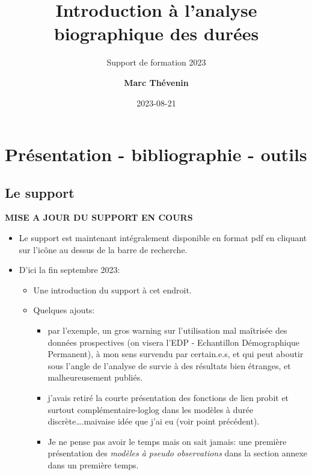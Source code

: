 \documentclass[
  12pt,
  letterpaper,
  DIV=11,
  numbers=noendperiod,
  onepage,
  openany]{scrreprt}
\title{Introduction à l'analyse biographique des durées}
\subtitle{Support de formation 2023}
\author{\textbf{Marc Thévenin}}
\date{2023-08-21}
\providecommand{\tightlist}{%
  \setlength{\itemsep}{0pt}\setlength{\parskip}{0pt}}\usepackage{longtable,booktabs,array}
\renewcommand*\contentsname{Table des matières}
\newcommand\contentsname{Table des matières}
\begin{document}
\maketitle
\renewcommand*\contentsname{Table des matières}
{
\hypersetup{linkcolor=}
\setcounter{tocdepth}{3}
\tableofcontents
}
\listoffigures
\listoftables
\hypertarget{pruxe9sentation---bibliographie---outils}{%
\chapter{\texorpdfstring{\textbf{Présentation - bibliographie -
outils}}{Présentation - bibliographie - outils}}\label{pruxe9sentation---bibliographie---outils}}

\hypertarget{le-support}{%
\section*{Le support}\label{le-support}}


\textbf{MISE A JOUR DU SUPPORT EN COURS}

\begin{itemize}
\item
  Le support est maintenant intégralement disponible en format pdf en
  cliquant sur l'icône au dessus de la barre de recherche.
\item
  D'ici la fin septembre 2023:

  \begin{itemize}
  \tightlist
  \item
    Une introduction du support à cet endroit.
  \item
    Quelques ajouts:

    \begin{itemize}
    \tightlist
    \item
      par l'exemple, un gros warning sur l'utilisation mal maîtrisée des
      données prospectives (on visera l'EDP - Echantillon Démographique
      Permanent), à mon sens survendu par certain.e.s, et qui peut
      aboutir sous l'angle de l'analyse de survie à des résultats bien
      étranges, et malheureusement publiés.
    \item
      j'avais retiré la courte présentation des fonctions de lien probit
      et surtout complémentaire-loglog dans les modèles à durée
      discrète\ldots.maivaise idée que j'ai eu (voir point précédent).
    \item
      Je ne pense pas avoir le temps mais on sait jamais: une première
      présentation des \emph{modèles à pseudo observations} dans la
      section annexe dans un première temps.
    \end{itemize}
  \end{itemize}
\end{itemize}
\end{document}
